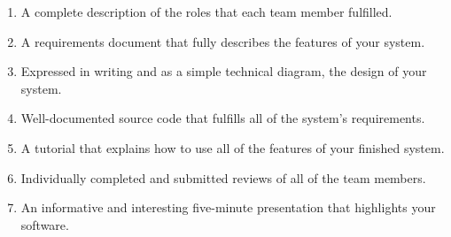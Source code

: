 \vspace*{-.1in}
\begin{enumerate}
  \setlength{\itemsep}{0in}
  \item A complete description of the roles that each team member fulfilled.
  \item A requirements document that fully describes the features of your system.
  \item Expressed in writing and as a simple technical diagram, the design of your system.
  \item Well-documented source code that fulfills all of the system's requirements.
  \item A tutorial that explains how to use all of the features of your finished system.
  \item Individually completed and submitted reviews of all of the team members.
  \item An informative and interesting five-minute presentation that highlights your software.
\end{enumerate}
\vspace*{-.1in}


